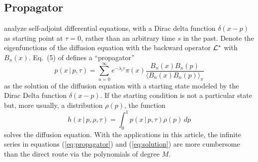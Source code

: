 \documentclass[preprint]{elsarticle}
\newcommand\given{{\,|\,}}
\begin{document}
\subsection{Propagator}\label{section:Greens_function}

\citet{Song12} analyze self-adjoint differential equations, with a Dirac delta function $\delta(x-p)$ as starting point at $\tau=0$, rather than an arbitrary time $s$ in the past. Denote the eigenfunctions of the diffusion equation with the backward operator $\cal{L}^*$ with $B_n(x)$. Eq.~(5) of \citet{Song12} defines a ``propagator'' \citep[][chap.~19]{Bayi06}
\begin{equation}\label{eq:propagator}
    p(x\given p,\tau)=\sum_{n=0}^\infty e^{-\lambda_i \tau}\pi(x) \frac{B_n(x)B_n(p)}{\langle B_n(x)B_n(p) \rangle_{\pi}}
\end{equation}
as the solution of the diffusion equation with a starting state modeled by the Dirac Delta function $\delta(x-p)$. If the starting condition is not a particular state but, more usually, a distribution $\rho(p)$, the function
\begin{equation}\label{eq:solution}
    h(x\given p,\rho,\tau)=\int_0^1 p(x\given p,\tau)\rho(p)\,dp
\end{equation}
solves the diffusion equation. With the applications in this article, the infinite series in equations (\ref{eq:propagator}) and (\ref{eq:solution}) are more cumbersome than the direct route via the polynomials of degree $M$. 
\end{document}

